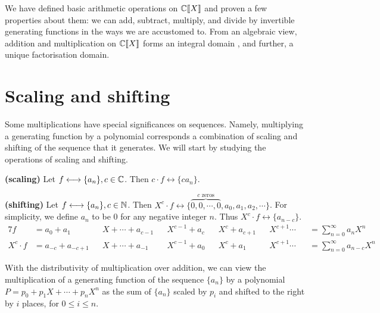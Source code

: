 \documentclass[a4paper, 12pt]{report}
\begin{document}
We have defined basic arithmetic operations on $\mathbb{C}\llbracket X\rrbracket$ and proven a few properties about them: we can add, subtract, multiply, and divide by invertible generating functions in the ways we are accustomed to. From an algebraic view, addition and multiplication on $\mathbb{C}\llbracket X\rrbracket$ forms an integral domain \autocite[873]{niven}, and further, a unique factorisation domain.

\section{Scaling and shifting}
Some multiplications have special significances on sequences. Namely, multiplying a generating function by a polynomial corresponds a combination of scaling and shifting of the sequence that it generates. We will start by studying the operations of scaling and shifting.

\begin{rem}\label{rem:gf-scaling}
\textbf{(scaling)} Let $f \longleftrightarrow \{a_n\}, c \in \mathbb{C}$. Then $c \cdot f \longleftrightarrow \{c a_n\}$.
\end{rem}

\begin{rem}\label{rem:gf-shifting}
\textbf{(shifting)} Let $f \longleftrightarrow \{a_n\}, c \in \mathbb{N}$. Then $X^c \cdot f \longleftrightarrow \{\overbrace{0, 0, \cdots, 0}^{c\text{ zeros}}, a_0, a_1, a_2, \cdots\}$. For simplicity, we define $a_{n}$ to be $0$ for any negative integer $n$. Thus $X^c \cdot f \longleftrightarrow \{a_{n - c}\}$.
\begin{alignat*}{7}
    f &= a_0 + a_1 &&X + \cdots + a_{c - 1} &&X^{c - 1} + a_c &&X^c + a_{c + 1} &&X^{c + 1} \cdots &&= \sum\nolimits_{n = 0}^\infty a_n X^n\\
    X^c \cdot f &= a_{-c} + a_{-c + 1}&&X + \cdots + a_{-1} &&X^{c - 1} + a_0 &&X^c + a_1 &&X^{c + 1}\cdots &&= \sum\nolimits_{n = 0}^\infty a_{n - c} X^n
\end{alignat*}
\end{rem}

With the distributivity of multiplication over addition, we can view the multiplication of a generating function of the sequence $\{a_n\}$ by a polynomial $P = p_0 + p_1 X + \cdots + p_n X^n$ as the sum of $\{a_n\}$ scaled by $p_i$ and shifted to the right by $i$ places, for $0 \leq i \leq n$.
\end{document}
